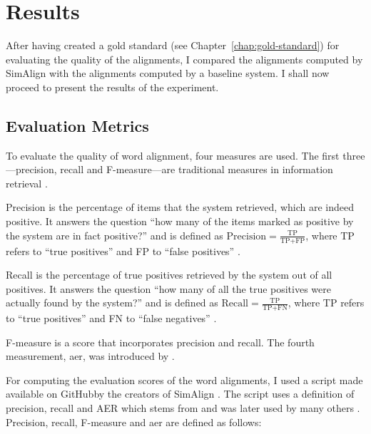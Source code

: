 \chapter{Results}\label{chap:results}

After having created a gold standard (see Chapter~\ref{chap:gold-standard}) for evaluating the quality of the alignments, I compared the alignments computed by SimAlign with the alignments computed by a baseline system.
I shall now proceed to present the results of the experiment.

\section{Evaluation Metrics}
\label{sec:evaluation-metrics}
To evaluate the quality of word alignment, four measures are used. 
The first three---precision, recall and F-measure---are traditional measures in information retrieval \autocite{mihalcea-pedersen-2003-evaluation}.

Precision is the percentage of items that the system retrieved, which are indeed positive.
It answers the question \enquote{how many of the items marked as positive by the system are in fact positive?} and is defined as $\text{Precision}=\frac{\text{TP}}{\text{TP}+\text{FP}}$, where TP refers to \enquote{true positives} and FP to \enquote{false positives} \autocite[67]{jurafsky-2019}.

Recall is the percentage of true positives retrieved by the system out of all positives.
It answers the question \enquote{how many of all the true positives were actually found by the system?} and is defined as $\text{Recall}=\frac{\text{TP}}{\text{TP}+\text{FN}}$, where TP refers to \enquote{true positives} and FN to \enquote{false negatives} \autocite[67]{jurafsky-2019}.

F-measure is a score that incorporates precision and recall. 
The fourth measurement, \acrfull{aer}, was introduced by \cite{och-ney-2000-improved}. 

For computing the evaluation scores of the word alignments, I used a script made available on GitHub\footnotemark by the creators of SimAlign \autocite{jalili-sabet-etal-2020-simalign}. 
The script uses a definition of precision, recall and AER which stems from \cite{och-ney-2000-improved} and was later used by many others \autocites{mihalcea-pedersen-2003-evaluation,och-ney-2003-systematic,Ostling2016efmaral,jalili-sabet-etal-2020-simalign}. Precision, recall, F-measure and \acrshort{aer} are defined as follows:


